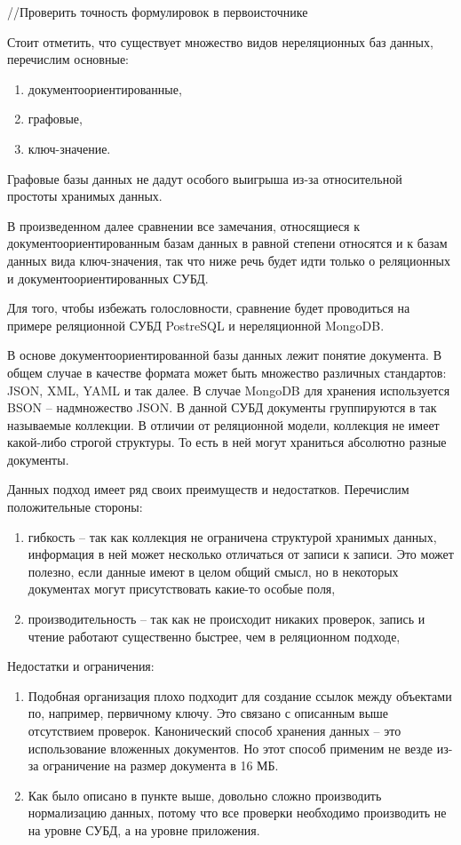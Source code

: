 //Проверить точность формулировок в первоисточнике

Стоит отметить, что существует множество видов нереляционных баз данных, перечислим
основные:

\begin{enumerate}
    \item документоориентированные,
    \item графовые,
    \item ключ-значение.
\end{enumerate}

Графовые базы данных не дадут особого выигрыша из-за относительной простоты хранимых данных.

В произведенном далее сравнении все замечания, относящиеся к документоориентированным базам данных
в равной степени относятся и к базам данных вида ключ-значения, так что ниже речь будет идти
только о реляционных и документоориентированных СУБД.

Для того, чтобы избежать голословности, сравнение будет проводиться на примере реляционной СУБД PostreSQL и 
нереляционной MongoDB.

В основе документоориентированной базы данных лежит понятие документа. В общем случае в качестве формата
может быть множество различных стандартов: JSON, XML, YAML и так далее. В случае MongoDB для хранения
используется BSON -- надмножество JSON. В данной СУБД документы группируются в так называемые
коллекции. В отличии от реляционной модели, коллекция не имеет какой-либо строгой структуры. То есть
в ней могут храниться абсолютно разные документы.

Данных подход имеет ряд своих преимуществ и недостатков. Перечислим положительные стороны:

\begin{enumerate}
    \item гибкость -- так как коллекция не ограничена структурой хранимых данных, информация
        в ней может несколько отличаться от записи к записи. Это может полезно, если
        данные имеют в целом общий смысл, но в некоторых документах могут присутствовать
        какие-то особые поля,
    \item производительность -- так как не происходит никаких проверок, запись и чтение
        работают существенно быстрее, чем в реляционном подходе,
\end{enumerate}

Недостатки и ограничения:

\begin{enumerate}
    \item Подобная организация плохо подходит для создание ссылок между объектами по, например,
        первичному ключу. Это связано с описанным выше отсутствием проверок. Канонический
        способ хранения данных -- это использование вложенных документов. Но этот способ
        применим не везде из-за ограничение на размер документа в 16 МБ.
    \item Как было описано в пункте выше, довольно сложно производить нормализацию
        данных, потому что все проверки необходимо производить не на уровне СУБД, а
        на уровне приложения.
\end{enumerate}

